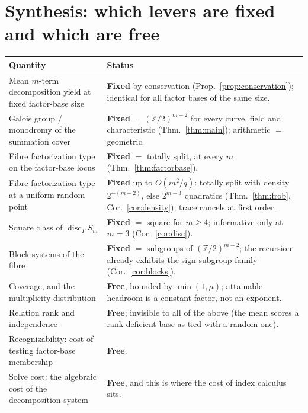 \documentclass[11pt,a4paper]{article}
\theoremstyle{plain}
\theoremstyle{definition}
\DeclareMathOperator{\disc}{disc}
\newcommand{\ZZ}{\mathbb{Z}}
\begin{document}
\section{Synthesis: which levers are fixed and which are free}\label{sec:synthesis}

\begin{center}
\begin{tabular}{@{}p{}p{}@{}}
\toprule
\textbf{Quantity} & \textbf{Status} \\
\midrule
Mean $m$-term decomposition yield at fixed factor-base size
  & \textbf{Fixed} by conservation (Prop.~\ref{prop:conservation}); identical
    for all factor bases of the same size. \\[2pt]
Galois group / monodromy of the summation cover
  & \textbf{Fixed} $= (\ZZ/2)^{m-2}$ for every curve, field and characteristic
    (Thm.~\ref{thm:main}); arithmetic $=$ geometric. \\[2pt]
Fibre factorization type on the factor-base locus
  & \textbf{Fixed} $=$ totally split, at every $m$
    (Thm.~\ref{thm:factorbase}). \\[2pt]
Fibre factorization type at a uniform random point
  & \textbf{Fixed} up to $O(m^2/q)$: totally split with density
    $2^{-(m-2)}$, else $2^{m-3}$ quadratics (Thm.~\ref{thm:frob},
    Cor.~\ref{cor:density}); trace cancels at first order. \\[2pt]
Square class of $\disc_T S_m$
  & \textbf{Fixed} $=$ square for $m \ge 4$; informative only at $m = 3$
    (Cor.~\ref{cor:disc}). \\[2pt]
Block systems of the fibre
  & \textbf{Fixed} $=$ subgroups of $(\ZZ/2)^{m-2}$; the recursion already
    exhibits the sign-subgroup family (Cor.~\ref{cor:blocks}). \\
\midrule
Coverage, and the multiplicity distribution
  & \textbf{Free}, bounded by $\min(1,\mu)$; attainable headroom is a constant
    factor, not an exponent. \\[2pt]
Relation rank and independence
  & \textbf{Free}; invisible to all of the above (the mean scores a
    rank-deficient base as tied with a random one). \\[2pt]
Recognizability: cost of testing factor-base membership
  & \textbf{Free}. \\[2pt]
Solve cost: the algebraic cost of the decomposition system
  & \textbf{Free}, and this is where the cost of index calculus sits. \\
\bottomrule
\end{tabular}
\end{center}
\end{document}
